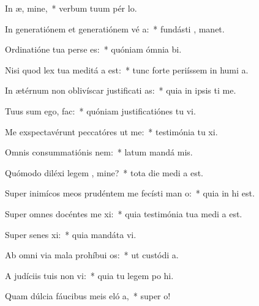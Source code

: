 \item In æ, mine,~* verbum tuum pér  lo.
\item In generatiónem et generatiónem vé a:~* fundásti ,  manet.
\item Ordinatióne tua perse es:~* quóniam ómnia  bi.
\item Nisi quod lex tua meditá a est:~* tunc forte periíssem in humi a.
\item In ætérnum non oblivíscar justificati as:~* quia in ipsis ti me.
\item Tuus sum ego,   fac:~* quóniam justificatiónes tu vi.
\item Me exspectavérunt peccatóres ut  me:~* testimónia tu xi.
\item Omnis consummatiónis  nem:~* latum mandá  mis.
\item Quómodo diléxi legem , mine?~* tota die medi a est.
\item Super inimícos meos prudéntem me fecísti man o:~* quia in  hi est.
\item Super omnes docéntes me xi:~* quia testimónia tua medi a est.
\item Super senes xi:~* quia mandáta  vi.
\item Ab omni via mala prohíbui  os:~* ut custódi  a.
\item A judíciis tuis non vi:~* quia tu legem po hi.
\item Quam dúlcia fáucibus meis eló a,~* super   o!
